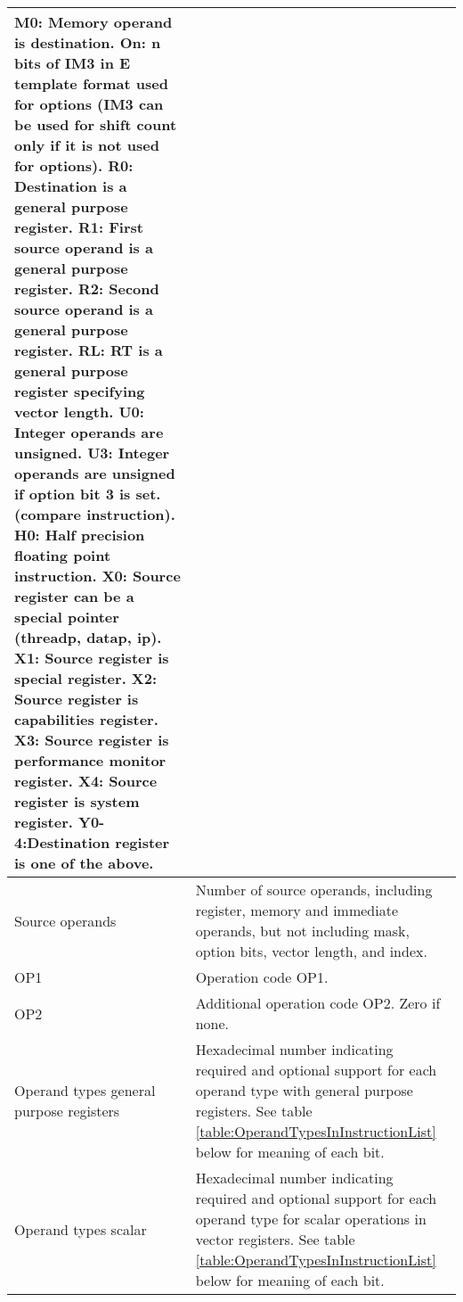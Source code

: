 \documentclass[forwardcom.tex]{subfiles}
\begin{document}
\begin{longtable} {|p{18mm}|p{100mm}|}
M0:  Memory operand is destination.\newline
On: n bits of IM3 in E template format used for options (IM3 can be used for shift count only if it is not used for options).\newline
R0:  Destination is a general purpose register.\newline
R1:  First source operand is a general purpose register.\newline
R2:  Second source operand is a general purpose register.\newline
RL:  RT is a general purpose register specifying vector length.\newline
U0:  Integer operands are unsigned.\newline
U3:  Integer operands are unsigned if option bit 3 is set.\newline \hspace{6mm}
     (compare instruction).\newline
H0:  Half precision floating point instruction.\newline
X0:  Source register can be a special pointer (threadp, datap, ip).\newline
X1:  Source register is special register.\newline
X2:  Source register is capabilities register.\newline
X3:  Source register is performance monitor register.\newline
X4:  Source register is system register.\newline
Y0-4:Destination register is one of the above.
\\ \hline
Source operands & Number of source operands, including register, memory and immediate operands, but not including mask, option bits, vector length, and index. \\
\hline
OP1 & Operation code OP1. \\
\hline
OP2 & Additional operation code OP2. Zero if none. \\
\hline
Operand types general purpose registers & Hexadecimal number indicating required and optional support for each operand type with general purpose registers. See table \ref{table:OperandTypesInInstructionList} below for meaning of each bit. \\
\hline
Operand types scalar & Hexadecimal number indicating required and optional support for each operand type for scalar operations in vector registers. See table \ref{table:OperandTypesInInstructionList} below for meaning of each bit. \\

\end{longtable}
\end{document}
